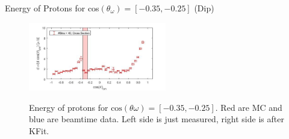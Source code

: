 \documentclass[
		10pt
		]{beamer}
\begin{document}
\begin{frame}{Energy of Protons for cos$(\theta_{\omega})=[-0.35,-0.25]$ (Dip)}
	
	\begin{figure}
		\hspace{0cm}  \vspace{-1cm}
		\includegraphics[width=6cm]{Plots/7}
	\end{figure}
	
	\begin{figure}%
		\centering
		\qquad
		\captionsetup{labelformat=empty}
		\caption{Energy of protons for $\textrm{cos}(\theta{\omega}) = [-0.35, -0.25] $. Red are MC and blue are beamtime data. Left side is just measured, right side is after KFit. }%
		\label{fig:example}%
	\end{figure}
	
\end{frame}
\end{document}
